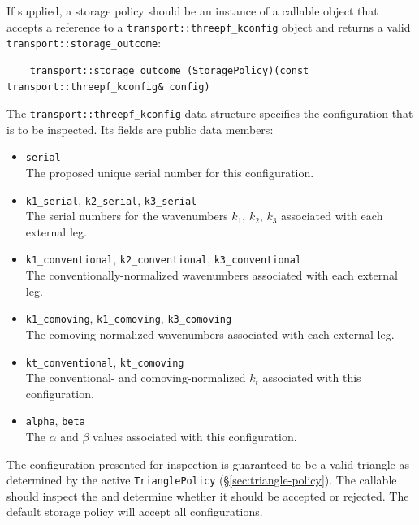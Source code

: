 \documentclass[11pt,a4paper]{article}
\newcommand{\texit}{t_{\text{exit}}}
\newcommand{\tmassless}{t_{\text{massless}}}
\begin{document}
If supplied, a storage policy should be an instance of a callable object
that accepts a reference to a \texttt{transport::threepf_kconfig}
object and returns a valid \texttt{transport::storage_outcome}:
\begin{verbatim}
    transport::storage_outcome (StoragePolicy)(const transport::threepf_kconfig& config)
\end{verbatim}
The \texttt{transport::threepf_kconfig} data structure specifies
the configuration that is to be inspected. Its fields are public data members:
\begin{itemize}
    \item \texttt{serial} \\
    The proposed unique serial number for this configuration.
    
    \item \texttt{k1_serial}, \texttt{k2_serial}, \texttt{k3_serial} \\
    The serial numbers for the wavenumbers $k_1$, $k_2$, $k_3$ associated with each external leg.
    
    \item \texttt{k1_conventional}, \texttt{k2_conventional}, \texttt{k3_conventional} \\
    The conventionally-normalized wavenumbers associated with each external leg.
    
    \item \texttt{k1_comoving}, \texttt{k1_comoving}, \texttt{k3_comoving} \\
    The comoving-normalized wavenumbers associated with each external leg.
    
    \item \texttt{kt_conventional}, \texttt{kt_comoving} \\
    The conventional- and comoving-normalized $k_t$ associated with this configuration.
    
    \item \texttt{alpha}, \texttt{beta} \\
    The $\alpha$ and $\beta$ values associated with this configuration.
    
\end{itemize}
The configuration presented for inspection is guaranteed to be a valid triangle as determined by the
active \texttt{TrianglePolicy} (\S\ref{sec:triangle-policy}).
The callable should inspect the and determine whether it should be accepted or rejected.
The default storage policy will accept all configurations.
\end{document}
